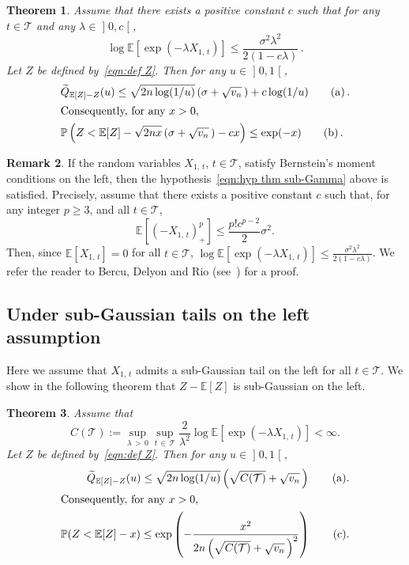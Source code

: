 \documentclass[10pt]{amsart}
\newtheorem{theo}{Theorem}[section]
\theoremstyle{definition}\newtheorem{defi}[theo]{Definition}\newtheorem{rema}[theo]{Remark}\newtheorem{exam}[theo]{Example}\newtheorem{exem}[theo]{Example}\newtheorem{nota}[theo]{Notation}
\newcommand{\bE}{\mathbb{E}}
\newcommand{\bP}{\mathbb{P}}
\newcommand{\cT}{\mathcal{T}}
\newcommand{\intervalleoo}[2]{\mathopen{]} #1\mathclose{}\mathpunct{},#2\mathclose{[}}
\let\oldtilde\tilde
\renewcommand*{\tilde}[1]{\mathchoice{\widetilde{#1}}{\widetilde{#1}}{\oldtilde{#1}}{\oldtilde{#1}}}
\begin{document}
\begin{theo}\label{thm:sub-Gamma}
Assume that there exists a positive constant $c$ such that for any $t\in\cT$ and any $\lambda\in\intervalleoo 0c$,
\begin{equation}\label{eqn:hyp thm sub-Gamma}
\log \bE[\exp(-\lambda X_{1,\,t})]\leq \frac{\sigma^2 \lambda^2}{2(1-c\lambda)}\,.
\end{equation}
Let $Z$ be defined by~\eqref{eqn:def Z}. Then for any $u\in\intervalleoo 01$,
\begin{align}
&\tilde Q_{\bE[Z]-Z}(u)\leq \sqrt{2n\log(1/u)}\left(\sigma+\sqrt{v_n}\,\right)+c\log(1/u) \tag{$\rm a$}\label{theo4.2.a}\,.
\\
\intertext{Consequently, for any $x>0$,}
&\bP\left(Z<\bE[Z]-\sqrt{2nx}\left(\sigma+\sqrt{v_n}\,\right)-cx\right)\leq \exp(-x) \tag{$\rm b$}\label{theo4.2.b}\,.
\end{align}
\end{theo}

\begin{rema}
If the random variables $X_{1,\,t}$, $t\in\cT$, satisfy Bernstein's moment conditions on the left, then the hypothesis~\eqref{eqn:hyp thm sub-Gamma} above is satisfied. Precisely, assume that there exists a positive constant $c$ such that, for any integer $p\geq 3$, and all $t\in\cT$,
\begin{equation}
\bE\left[(-X_{1,\,t})_+^p\right]\leq\frac{p! c^{p-2}}{2}\sigma^2.
\end{equation}
Then, since $\bE[X_{1,\,t}]=0$ for all $t\in\cT$, $\log \bE[\exp(-\lambda X_{1,\,t})]\leq \frac{\sigma^2 \lambda^2}{2(1-c\lambda)}$. We refer the reader to Bercu, Delyon and Rio (see~\cite[the proof of their Theorem~2.1]{BDR15}) for a proof.
\end{rema}

\subsection{Under sub-Gaussian tails on the left assumption}\label{subsection:sub-Gaussian}
Here we assume that $X_{1,\,t}$ admits a sub-Gaussian tail on the left for all $t\in\cT$. We show in the following theorem that $Z-\bE[Z]$ is sub-Gaussian on the left.

\begin{theo}\label{thm:sub-Gaussian}
Assume that
\begin{equation}\label{eqn:hyp thm sub-Gaussian}
C(\cT):=\sup_{\lambda\,>\,0}\sup_{t\,\in\,\cT}\frac {2}{\lambda^2}\log \bE\left[\exp(-\lambda X_{1,\,t})\right]<\infty.
\end{equation}
Let $Z$ be defined by~\eqref{eqn:def Z}. Then for any $u\in\intervalleoo 01$,
\begin{align}
\tilde Q_{\bE[Z]-Z}(u)
\leq \sqrt{2n\log(1/u)}\left(\sqrt{C(\cT)}+\sqrt{v_n}\,\right) \tag{$\rm a$}\label{theo4.4.a}.
\\
\intertext{Consequently, for any $x>0$,}
\bP(Z<\bE[Z]-x)\leq \exp\left(-\frac{x^2}{2n\left(\sqrt{C(\cT)}+\sqrt{v_n}\,\right)^2}\right)\tag{$\rm c$}\label{theo4.4.c}.
\end{align}
\end{theo}
\end{document}
